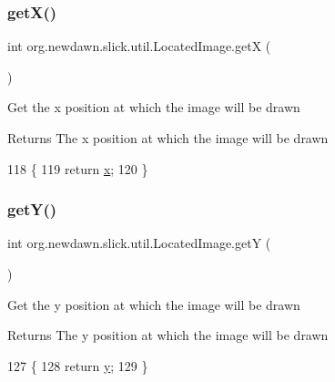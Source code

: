 \subsubsection{\texorpdfstring{get\+X()}{getX()}}
{\footnotesize\ttfamily int org.\+newdawn.\+slick.\+util.\+Located\+Image.\+getX (\begin{DoxyParamCaption}{ }\end{DoxyParamCaption})\hspace{0.3cm}{\ttfamily [inline]}}

Get the x position at which the image will be drawn

\begin{DoxyReturn}{Returns}
The x position at which the image will be drawn 
\end{DoxyReturn}

\begin{DoxyCode}
118                       \{
119         \textcolor{keywordflow}{return} \mbox{\hyperlink{classorg_1_1newdawn_1_1slick_1_1util_1_1_located_image_a232edc0d0afe15fab0fc849dd163f94c}{x}};
120     \}
\end{DoxyCode}
\mbox{\label{classorg_1_1newdawn_1_1slick_1_1util_1_1_located_image_a28ed4e0ec6923ee294b46f91c9b455e9}} 
\subsubsection{\texorpdfstring{get\+Y()}{getY()}}
{\footnotesize\ttfamily int org.\+newdawn.\+slick.\+util.\+Located\+Image.\+getY (\begin{DoxyParamCaption}{ }\end{DoxyParamCaption})\hspace{0.3cm}{\ttfamily [inline]}}

Get the y position at which the image will be drawn

\begin{DoxyReturn}{Returns}
The y position at which the image will be drawn 
\end{DoxyReturn}

\begin{DoxyCode}
127                       \{
128         \textcolor{keywordflow}{return} \mbox{\hyperlink{classorg_1_1newdawn_1_1slick_1_1util_1_1_located_image_ad6f8eeb5d7712227a3b3eeaad97c8d85}{y}};
129     \}
\end{DoxyCode}
\mbox{\label{classorg_1_1newdawn_1_1slick_1_1util_1_1_located_image_a4a4f8ac6cf9c21df8ae2d2becb06d3a5}} 
